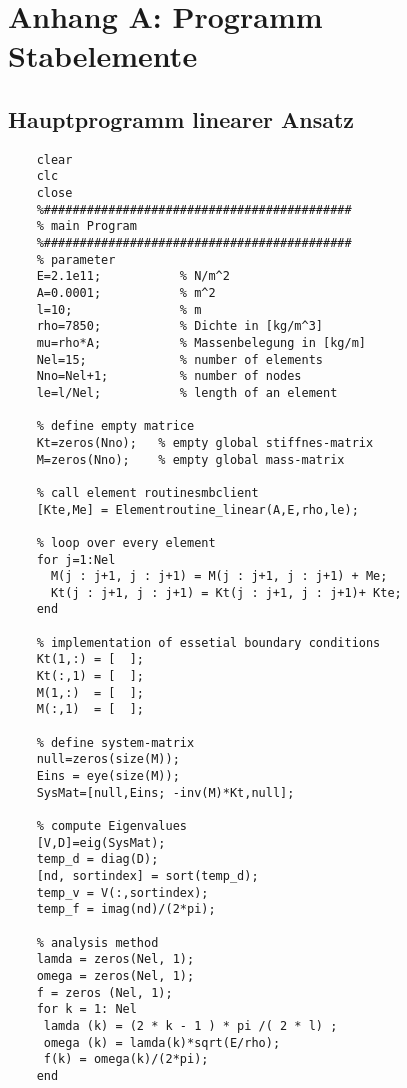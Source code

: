 	\pagestyle{fancy}
	\setcounter{page}{1} 
	\section*{Anhang A: Programm Stabelemente}
	\subsection*{Hauptprogramm linearer Ansatz}
	\begin{lstlisting}
	clear
	clc
	close
	%###########################################
	% main Program
	%###########################################
	% parameter
	E=2.1e11;           % N/m^2
	A=0.0001;           % m^2
	l=10;               % m
	rho=7850;           % Dichte in [kg/m^3]
	mu=rho*A;           % Massenbelegung in [kg/m]
	Nel=15;             % number of elements
	Nno=Nel+1;          % number of nodes
	le=l/Nel;           % length of an element
	
	% define empty matrice
	Kt=zeros(Nno);   % empty global stiffnes-matrix 
	M=zeros(Nno);    % empty global mass-matrix 
	
	% call element routinesmbclient
	[Kte,Me] = Elementroutine_linear(A,E,rho,le);
	
	% loop over every element
	for j=1:Nel  
	  M(j : j+1, j : j+1) = M(j : j+1, j : j+1) + Me;
	  Kt(j : j+1, j : j+1) = Kt(j : j+1, j : j+1)+ Kte;	
	end
	
	% implementation of essetial boundary conditions
	Kt(1,:) = [  ];
	Kt(:,1) = [  ];
	M(1,:)  = [  ];
	M(:,1)  = [  ];
	
	% define system-matrix
	null=zeros(size(M));
	Eins = eye(size(M));
	SysMat=[null,Eins; -inv(M)*Kt,null];
	
	% compute Eigenvalues
	[V,D]=eig(SysMat);
	temp_d = diag(D);
	[nd, sortindex] = sort(temp_d);
	temp_v = V(:,sortindex);
	temp_f = imag(nd)/(2*pi);
	
	% analysis method
	lamda = zeros(Nel, 1);
	omega = zeros(Nel, 1);
	f = zeros (Nel, 1);
	for k = 1: Nel
	 lamda (k) = (2 * k - 1 ) * pi /( 2 * l) ;
	 omega (k) = lamda(k)*sqrt(E/rho);
	 f(k) = omega(k)/(2*pi);
	end
	\end{lstlisting}

